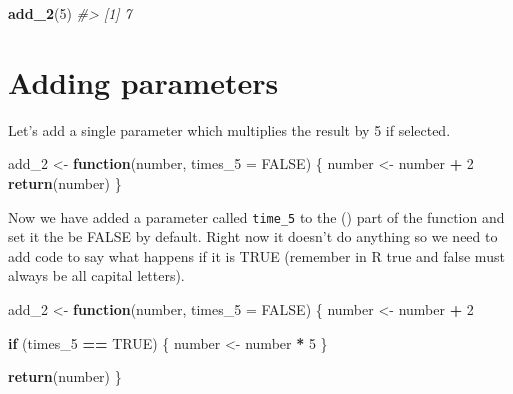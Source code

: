 \documentclass[
  12pt,
]{book}
\newenvironment{Shaded}{\begin{snugshade}}{\end{snugshade}}
\newcommand{\CommentTok}[1]{\textcolor[rgb]{0.37,0.37,0.37}{\textit{#1}}}
\newcommand{\ControlFlowTok}[1]{\textcolor[rgb]{0.27,0.27,0.27}{\textbf{#1}}}
\newcommand{\DataTypeTok}[1]{\textcolor[rgb]{0.27,0.27,0.27}{#1}}
\newcommand{\DecValTok}[1]{\textcolor[rgb]{0.06,0.06,0.06}{#1}}
\newcommand{\KeywordTok}[1]{\textcolor[rgb]{0.27,0.27,0.27}{\textbf{#1}}}
\newcommand{\NormalTok}[1]{#1}
\newcommand{\OperatorTok}[1]{\textcolor[rgb]{0.43,0.43,0.43}{\textbf{#1}}}
\newcommand{\OtherTok}[1]{\textcolor[rgb]{0.37,0.37,0.37}{#1}}
\newcommand{\StringTok}[1]{\textcolor[rgb]{0.5,0.5,0.5}{#1}}
\begin{document}
\begin{Shaded}
\begin{Highlighting}[]
\KeywordTok{add\_2}\NormalTok{(}\DecValTok{5}\NormalTok{)}
\CommentTok{\#\textgreater{} [1] 7}
\end{Highlighting}
\end{Shaded}

\hypertarget{adding-parameters}{%
\section{Adding parameters}\label{adding-parameters}}

Let's add a single parameter which multiplies the result by 5 if selected.

\begin{Shaded}
\begin{Highlighting}[]
\NormalTok{add\_}\DecValTok{2}\NormalTok{ \textless{}{-}}\StringTok{ }\ControlFlowTok{function}\NormalTok{(number, }\DataTypeTok{times\_5 =} \OtherTok{FALSE}\NormalTok{) \{}
\NormalTok{  number \textless{}{-}}\StringTok{ }\NormalTok{number }\OperatorTok{+}\StringTok{ }\DecValTok{2}
  \KeywordTok{return}\NormalTok{(number)}
\NormalTok{\}}
\end{Highlighting}
\end{Shaded}

Now we have added a parameter called \texttt{time\_5} to the () part of the function and set it the be FALSE by default. Right now it doesn't do anything so we need to add code to say what happens if it is TRUE (remember in R true and false must always be all capital letters).

\begin{Shaded}
\begin{Highlighting}[]
\NormalTok{add\_}\DecValTok{2}\NormalTok{ \textless{}{-}}\StringTok{ }\ControlFlowTok{function}\NormalTok{(number, }\DataTypeTok{times\_5 =} \OtherTok{FALSE}\NormalTok{) \{}
\NormalTok{  number \textless{}{-}}\StringTok{ }\NormalTok{number }\OperatorTok{+}\StringTok{ }\DecValTok{2}
  
  \ControlFlowTok{if}\NormalTok{ (times\_}\DecValTok{5} \OperatorTok{==}\StringTok{ }\OtherTok{TRUE}\NormalTok{) \{}
\NormalTok{    number \textless{}{-}}\StringTok{ }\NormalTok{number }\OperatorTok{*}\StringTok{ }\DecValTok{5}
\NormalTok{  \}}
  
  \KeywordTok{return}\NormalTok{(number)}
\NormalTok{\}}
\end{Highlighting}
\end{Shaded}
\end{document}
